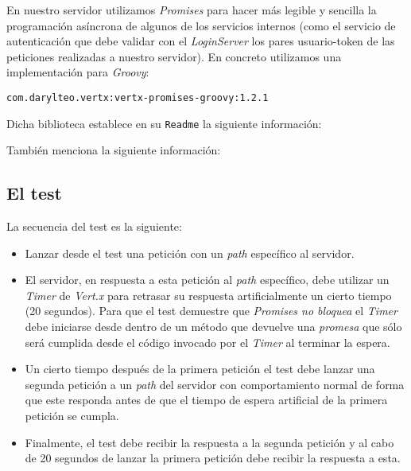 En nuestro servidor utilizamos \emph{Promises} para hacer más legible y sencilla
la programación asíncrona de algunos de los servicios internos (como el servicio
de autenticación que debe validar con el \emph{LoginServer} los pares 
usuario-token de las peticiones realizadas a nuestro servidor). En concreto utilizamos
una implementación para \emph{Groovy}:

\texttt{com.darylteo.vertx:vertx-promises-groovy:1.2.1}

Dicha biblioteca establece en su \texttt{Readme} la siguiente información:


También menciona la siguiente información:


\subsection{El test}
La secuencia del test es la siguiente:

\begin{itemize}
 \item Lanzar desde el test una petición con un \emph{path} específico al servidor.
 \item El servidor, en respuesta a esta petición al \emph{path} específico,
       debe utilizar un \emph{Timer} de \emph{Vert.x} para retrasar su respuesta
       artificialmente un cierto tiempo (20 segundos). Para que el test
       demuestre que \emph{Promises no bloquea} el \emph{Timer} debe iniciarse
       desde dentro de un método que devuelve una \emph{promesa} que sólo será
       cumplida desde el código invocado por el \emph{Timer} al terminar la
       espera.
 \item Un cierto tiempo después de la primera petición el test debe lanzar una
       segunda petición a un \emph{path} del servidor con comportamiento normal
       de forma que este responda antes de que el tiempo de espera artificial
       de la primera petición se cumpla.
 \item Finalmente, el test debe recibir la respuesta a la segunda petición y
       al cabo de 20 segundos de lanzar la primera petición debe recibir la respuesta
       a esta.
\end{itemize}

